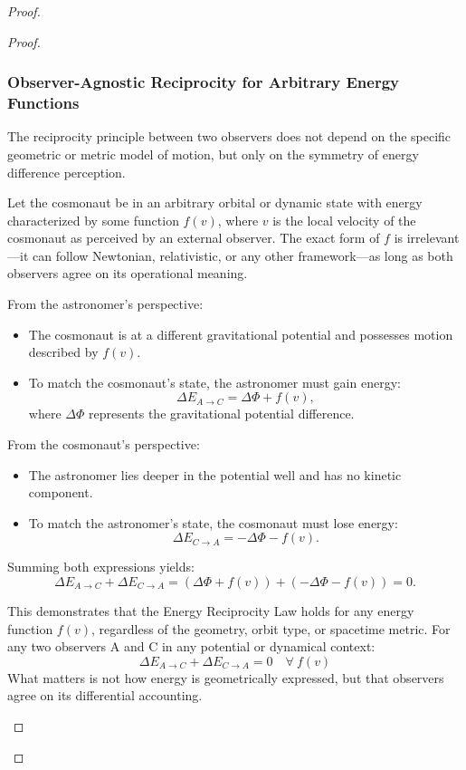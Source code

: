 \documentclass{article}
\begin{document}
\begin{theorem}
\begin{proof}
\begin{proof}
\subsubsection{Observer-Agnostic Reciprocity for Arbitrary Energy Functions}

The reciprocity principle between two observers does not depend on the specific geometric or metric model of motion, but only on the symmetry of energy difference perception.

Let the cosmonaut be in an arbitrary orbital or dynamic state with energy characterized by some function \( f(v) \), where \( v \) is the local velocity of the cosmonaut as perceived by an external observer. The exact form of \( f \) is irrelevant—it can follow Newtonian, relativistic, or any other framework—as long as both observers agree on its operational meaning.

From the astronomer's perspective:
\begin{itemize}
    \item The cosmonaut is at a different gravitational potential and possesses motion described by \( f(v) \).
    \item To match the cosmonaut's state, the astronomer must gain energy:
    \[
    \Delta E_{A \rightarrow C} = \Delta \Phi + f(v),
    \]
    where \( \Delta \Phi \) represents the gravitational potential difference.
\end{itemize}

From the cosmonaut's perspective:
\begin{itemize}
    \item The astronomer lies deeper in the potential well and has no kinetic component.
    \item To match the astronomer's state, the cosmonaut must lose energy:
    \[
    \Delta E_{C \rightarrow A} = -\Delta \Phi - f(v).
    \]
\end{itemize}

Summing both expressions yields:
\[
\Delta E_{A \rightarrow C} + \Delta E_{C \rightarrow A} = (\Delta \Phi + f(v)) + (-\Delta \Phi - f(v)) = 0.
\]

\begin{tcolorbox}[colback=gray!5, colframe=black!80!black, title=Geometric Independence]
This demonstrates that the Energy Reciprocity Law holds for any energy function \( f(v) \), regardless of the geometry, orbit type, or spacetime metric. For any two observers A and C in any potential or dynamical context: 
\[
\boxed{
\Delta E_{A \rightarrow C} + \Delta E_{C \rightarrow A} = 0 \quad \forall \ f(v)
}
\]
What matters is not how energy is geometrically expressed, but that observers agree on its differential accounting.
\end{tcolorbox}


\end{proof}
\end{proof}
\end{theorem}
\end{document}
